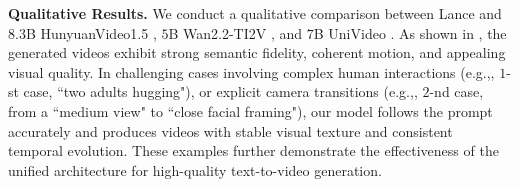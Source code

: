 \documentclass{llmxive}
\providecommand{\eg}{e.g.,\xspace}
\begin{document}
\textbf{Qualitative Results.}
We conduct a qualitative comparison between Lance and $8.3$B HunyuanVideo1.5 \cite{wu2025hunyuanvideo}, $5$B Wan2.2-TI2V \cite{wan2025wan}, and $7$B UniVideo \cite{wei2025univideo}.
As shown in , the generated videos exhibit strong semantic fidelity, coherent motion, and appealing visual quality. In challenging cases involving complex human interactions (\eg, $1$-st case, ``two adults hugging"), or explicit camera transitions (\eg, $2$-nd case, from a ``medium view" to ``close facial framing"), our model follows the prompt accurately and produces videos with stable visual texture and consistent temporal evolution. These examples further demonstrate the effectiveness of the unified architecture for high-quality text-to-video generation.
\end{document}
